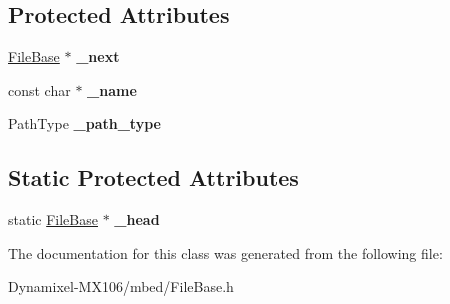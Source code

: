 \subsection*{Protected Attributes}
\begin{DoxyCompactItemize}
\item 
\hyperlink{classmbed_1_1_file_base}{File\+Base} $\ast$ {\bfseries \+\_\+next}\hypertarget{classmbed_1_1_file_base_acef47c84dc296ce35d5d2aa3695062af}{}\label{classmbed_1_1_file_base_acef47c84dc296ce35d5d2aa3695062af}

\item 
const char $\ast$ {\bfseries \+\_\+name}\hypertarget{classmbed_1_1_file_base_a9f22fa8bd5986c32dcf8e0a19f95e3b5}{}\label{classmbed_1_1_file_base_a9f22fa8bd5986c32dcf8e0a19f95e3b5}

\item 
Path\+Type {\bfseries \+\_\+path\+\_\+type}\hypertarget{classmbed_1_1_file_base_ae4a065275d45e77c512ec2d7c10f5d7b}{}\label{classmbed_1_1_file_base_ae4a065275d45e77c512ec2d7c10f5d7b}

\end{DoxyCompactItemize}
\subsection*{Static Protected Attributes}
\begin{DoxyCompactItemize}
\item 
static \hyperlink{classmbed_1_1_file_base}{File\+Base} $\ast$ {\bfseries \+\_\+head}\hypertarget{classmbed_1_1_file_base_ae9af3d7b863ca499d4e4a779632094f5}{}\label{classmbed_1_1_file_base_ae9af3d7b863ca499d4e4a779632094f5}

\end{DoxyCompactItemize}


The documentation for this class was generated from the following file\+:\begin{DoxyCompactItemize}
\item 
Dynamixel-\/\+M\+X106/mbed/File\+Base.\+h\end{DoxyCompactItemize}
